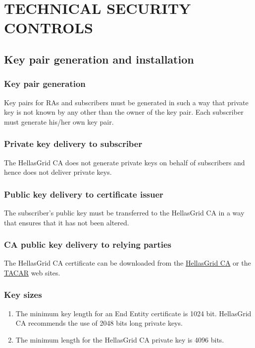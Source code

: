 
\chapter{TECHNICAL SECURITY CONTROLS}
\section{Key pair generation and installation}
\subsection{Key pair generation}

Key pairs for RAs and subscribers must be generated in such a way that private key is not known by any other than the owner of the key pair. Each subscriber must generate his/her own key pair. 

\subsection{Private key delivery to subscriber}

The HellasGrid CA does not generate private keys on behalf of subscribers and hence does not deliver private keys.

\subsection{Public key delivery to certificate issuer}

The subscriber's public key must be transferred to the HellasGrid CA in a way that ensures that it has not been altered.

\subsection{CA public key delivery to relying parties}

The HellasGrid CA certificate can be downloaded from the \href{http://www.grid.auth.gr/pki/hellasgrid-ca}{HellasGrid CA} or the \href{http://www.tacar.org}{TACAR} web sites.

\subsection{Key sizes}
\begin{enumerate}
\item{The minimum key length for an End Entity certificate is 1024 bit. HellasGrid CA recommends the use of 2048 bits long private keys.}
\item{The minimum length for the HellasGrid CA private key is 4096 bits.}
\end{enumerate}

